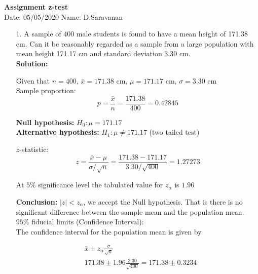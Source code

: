 \documentclass[a4paper,10pt,openright]{report}
\begin{document}
\singlespacing
\pagestyle{plain}

\begin{center}
\textbf{Assignment z-test} \\
Date: 05/05/2020 \hspace{2mm} Name: D.Saravanan
\end{center}

\vspace{10px}

\begin{enumerate}

\item[1.] A sample of 400 male students is found to have a mean height of 171.38 cm. Can it
be reasonably regarded as a sample from a large population with mean height 171.17 cm and
standard deviation 3.30 cm. \\

\textbf{Solution:}

Given that $n = 400$, $\bar x = 171.38$ cm, $\mu = 171.17$ cm, $\sigma = 3.30$ cm \\ 

Sample proportion:
\begin{equation*}
p = \frac{\bar x}{n} = \frac{171.38}{400} = 0.42845
\end{equation*}

\textbf{Null hypothesis:} $H_{0}: \mu = 171.17$ \\
\textbf{Alternative hypothesis:} $H_{1}: \mu \neq 171.17$ \hspace{5px} (two tailed test)

$z$-statistic:
\begin{equation*}
z = \frac{\bar x - \mu}{\sigma/\sqrt{n}}
  = \frac{171.38 - 171.17}{3.30/\sqrt{400}}
  = 1.27273
\end{equation*}

At $5\%$ significance level the tabulated value for $z_{\alpha}$ is $1.96$ 

\textbf{Conclusion:} $|z| < z_{\alpha}$, we accept the Null hypothesis. That is there is no
significant difference between the sample mean and the population mean. \\

$95\%$ fiducial limits (Confidence Interval): \\
The confidence interval for the population mean is given by 

\begin{equation*}
\begin{split}
&\bar x \pm z_{\alpha} \frac{\sigma}{\sqrt{n}} \\
&171.38 \pm 1.96 \frac{3.30}{\sqrt{400}} = 171.38 \pm 0.3234
\end{split}
\end{equation*}


\end{enumerate}
\end{document}
